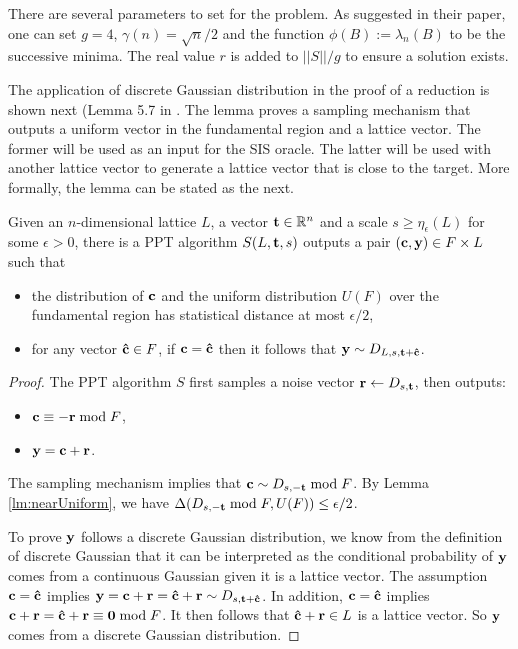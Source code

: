 \documentclass[../main.tex]{subfiles}
\begin{document}
There are several parameters to set for the problem. As suggested in their paper, one can set $g=4$, $\gamma(n)=\sqrt{n}/2$ and the function $\phi(B):=\lambda_n(B)$ to be the successive minima. The real value $r$ is added to $||S||/g$ to ensure a solution exists. 

The application of discrete Gaussian distribution in the proof of a reduction is shown next (Lemma 5.7 in \citep{micciancio07worst}. The lemma proves a sampling mechanism that outputs a uniform vector in the fundamental region and a lattice vector. The former will be used as an input for the SIS oracle. The latter will be used with another lattice vector to generate a lattice vector that is close to the target. More formally, the lemma can be stated as the next. 

\begin{lemma}
Given an $n$-dimensional lattice $L$, a vector $\mathbf{t} \in \mathbb{R}^n$ and a scale $s \ge \eta_{\epsilon}(L)$ for some $\epsilon>0$, there is a PPT algorithm $S(L,\mathbf{t},s)$ outputs a pair $(\mathbf{c},\mathbf{y}) \in F \times L$ such that 
\begin{itemize}
    \item the distribution of $\mathbf{c}$ and the uniform distribution $U(F)$ over the fundamental region has statistical distance at most $\epsilon/2$,
    \item for any vector $\mathbf{\hat{c}} \in F$, if $\mathbf{c}=\mathbf{\hat{c}}$ then it follows that $\mathbf{y} \sim D_{L,s,\mathbf{t}+\mathbf{\hat{c}}}$.
\end{itemize}
\end{lemma}

\begin{proof}
The PPT algorithm $S$ first samples a noise vector $\mathbf{r} \leftarrow D_{s,\mathbf{t}}$, then outputs:
\begin{itemize}
    \item $\mathbf{c} \equiv -\mathbf{r} \bmod F$,
    \item $\mathbf{y}=\mathbf{c}+\mathbf{r}$.
\end{itemize}
The sampling mechanism implies that $\mathbf{c} \sim D_{s,-\mathbf{t}} \bmod F$. By Lemma \ref{lm:nearUniform}, we have $\Delta(D_{s,-\mathbf{t}} \bmod F, U(F)) \le \epsilon/2$. 

To prove $\mathbf{y}$ follows a discrete Gaussian distribution, we know from the definition of discrete Gaussian that it can be interpreted as the conditional probability of $\mathbf{y}$ comes from a continuous Gaussian given it is a lattice vector. The assumption $\mathbf{c}=\mathbf{\hat{c}}$ implies $\mathbf{y}=\mathbf{c}+\mathbf{r}=\mathbf{\hat{c}}+\mathbf{r} \sim D_{s,\mathbf{t}+\mathbf{\hat{c}}}$. In addition, $\mathbf{c}=\mathbf{\hat{c}}$ implies $\mathbf{c}+\mathbf{r} = \mathbf{\hat{c}}+\mathbf{r} \equiv \mathbf{0} \bmod F$. It then follows that $\mathbf{\hat{c}}+\mathbf{r} \in L$ is a lattice vector. So $\mathbf{y}$ comes from a discrete Gaussian distribution.
\end{proof}
\end{document}
